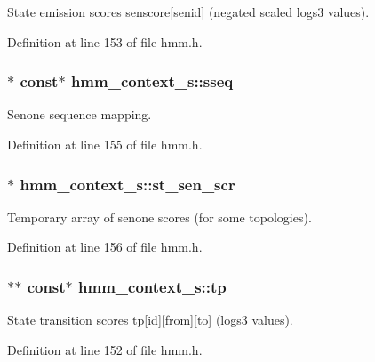 \-State emission scores senscore[senid] (negated scaled logs3 values). 



\-Definition at line 153 of file hmm.\-h.

\subsubsection[{sseq}]{$\ast$ const$\ast$ {\bf hmm\-\_\-context\-\_\-s\-::sseq}}\label{structhmm__context__s_abbb0a32aadcc1938d9f21b04204c52da}


\-Senone sequence mapping. 



\-Definition at line 155 of file hmm.\-h.

\subsubsection[{st\-\_\-sen\-\_\-scr}]{$\ast$ {\bf hmm\-\_\-context\-\_\-s\-::st\-\_\-sen\-\_\-scr}}\label{structhmm__context__s_a671c02e0443f41914471a7acfac6125c}


\-Temporary array of senone scores (for some topologies). 



\-Definition at line 156 of file hmm.\-h.

\subsubsection[{tp}]{$\ast$$\ast$ const$\ast$ {\bf hmm\-\_\-context\-\_\-s\-::tp}}\label{structhmm__context__s_a9ef2d83f67525050bea8b05f8a118f44}


\-State transition scores tp[id][from][to] (logs3 values). 



\-Definition at line 152 of file hmm.\-h.

